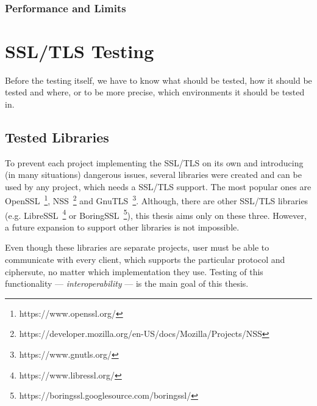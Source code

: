      \\

\subsection{Performance and Limits} \label{ref:performance-limits}

\chapter {SSL/TLS Testing} \label{chap:ssl_tls_testing}
    Before the testing itself, we have to know what should be tested, how it
    should be tested and where, or to be more precise, which environments it
    should be tested in.

\section{Tested Libraries}
    To prevent each project implementing the SSL/TLS on its own and introducing
    (in many situations) dangerous issues, several libraries were created and
    can be used by any project, which needs a SSL/TLS support. The most
    popular ones are OpenSSL~\footnote{https://www.openssl.org/},
    NSS~\footnote{https://developer.mozilla.org/en-US/docs/Mozilla/Projects/NSS}
    and GnuTLS~\footnote{https://www.gnutls.org/}. Although, there are other
    SSL/TLS libraries (e.g. LibreSSL~\footnote{https://www.libressl.org/} or
    BoringSSL~\footnote{https://boringssl.googlesource.com/boringssl/}),
    this thesis aims only on these three. However, a future
    expansion to support other libraries is not impossible.

    Even though these libraries are
    separate projects, user must be able to communicate with every client,
    which supports the particular protocol and ciphersute, no matter which
    implementation they use. Testing of this functionality --- \textit{interoperability} ---
    is the main goal of this thesis.

